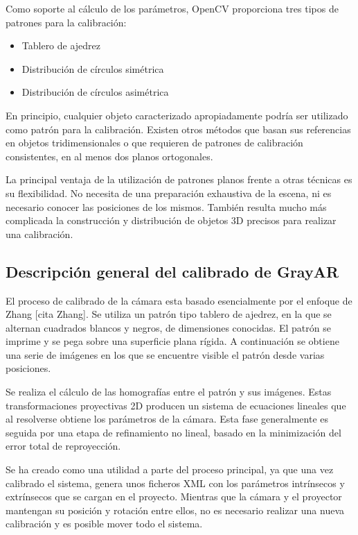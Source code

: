 Como soporte al cálculo de los parámetros, OpenCV proporciona tres tipos de patrones para la calibración:

\begin{itemize}
\item Tablero de ajedrez
\item Distribución de círculos simétrica
\item Distribución de círculos asimétrica 
\end{itemize}

En principio, cualquier objeto caracterizado apropiadamente podría ser utilizado como patrón para la calibración. Existen otros métodos que basan sus referencias en objetos tridimensionales o que requieren de patrones de calibración consistentes, en al menos dos planos ortogonales. 

La principal ventaja de la utilización de patrones planos frente a otras técnicas es su flexibilidad. No necesita de una preparación exhaustiva de la escena, ni es necesario conocer las posiciones de los mismos. También resulta mucho más complicada la construcción y distribución de objetos 3D precisos para realizar una calibración.

\subsection{Descripción general del calibrado de GrayAR}
El proceso de calibrado de la cámara esta basado esencialmente por el enfoque de Zhang [cita Zhang]. Se utiliza un patrón tipo tablero de ajedrez, en la que se alternan cuadrados blancos y negros, de dimensiones conocidas. El patrón se imprime y se pega sobre una superficie plana rígida. A continuación se obtiene una serie de imágenes en los que se encuentre visible el patrón desde varias posiciones. 

Se realiza el cálculo de las homografías entre el patrón y sus imágenes. Estas transformaciones proyectivas 2D producen un sistema de ecuaciones lineales que al resolverse obtiene los parámetros de la cámara. Esta fase generalmente es seguida por una etapa de refinamiento no lineal, basado en la minimización del error total de reproyección.

Se ha creado como una utilidad a parte del proceso principal, ya que una vez calibrado el sistema, genera unos ficheros XML con los parámetros intrínsecos y extrínsecos que se cargan en el proyecto. Mientras que la cámara y el proyector mantengan su posición y rotación entre ellos, no es necesario realizar una nueva calibración y es posible mover todo el sistema.

